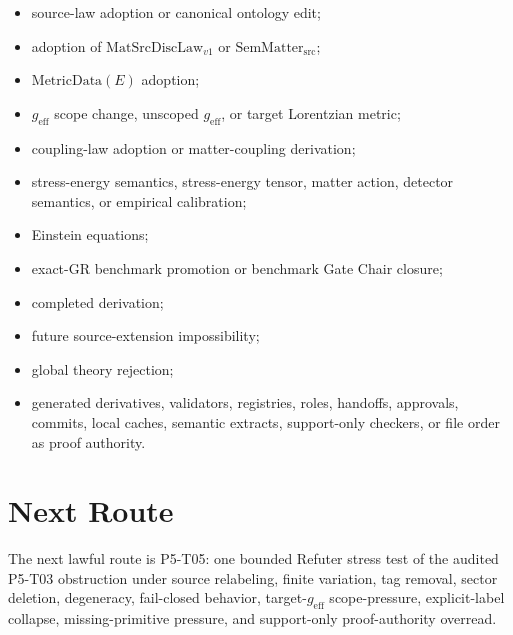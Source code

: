 \documentclass[11pt]{article}
\newcommand{\MetricData}{\mathrm{MetricData}}
\newcommand{\geff}{g_{\mathrm{eff}}}
\newcommand{\MatSrcDiscLaw}{\mathrm{MatSrcDiscLaw}_{v1}}
\newcommand{\SemMatterSrc}{\mathrm{SemMatter}_{\mathrm{src}}}
\begin{document}
\begin{itemize}[leftmargin=*]
\item source-law adoption or canonical ontology edit;
\item adoption of \(\MatSrcDiscLaw\) or \(\SemMatterSrc\);
\item \(\MetricData(E)\) adoption;
\item \(\geff\) scope change, unscoped \(\geff\), or target Lorentzian metric;
\item coupling-law adoption or matter-coupling derivation;
\item stress-energy semantics, stress-energy tensor, matter action, detector
  semantics, or empirical calibration;
\item Einstein equations;
\item exact-GR benchmark promotion or benchmark Gate Chair closure;
\item completed derivation;
\item future source-extension impossibility;
\item global theory rejection;
\item generated derivatives, validators, registries, roles, handoffs,
  approvals, commits, local caches, semantic extracts, support-only checkers,
  or file order as proof authority.
\end{itemize}

\section{Next Route}

The next lawful route is P5-T05: one bounded Refuter stress test of the audited
P5-T03 obstruction under source relabeling, finite variation, tag removal,
sector deletion, degeneracy, fail-closed behavior, target-\(\geff\)
scope-pressure, explicit-label collapse, missing-primitive pressure, and
support-only proof-authority overread.
\end{document}
